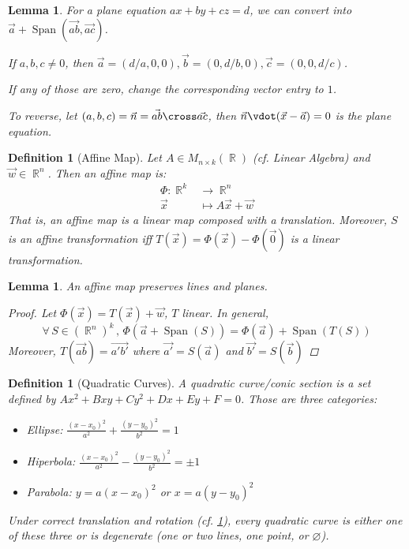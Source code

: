\documentclass[12pt]{article}
\let\emptyset\varnothing
\DeclareMathOperator{\Span}{Span}
\newcommand{\Forall}[1]{\forall\,{#1}\,,\,}
\DeclareMathOperator{\R}{\mathbb{R}}
\newtheorem{definition}[theorem]{Definition}
\newtheorem{lemma}[theorem]{Lemma}
\begin{document}
\begin{lemma}
  For a plane equation $ax+by+cz=d$, we can convert into $\vec{a}+\Span(\vec{ab},\vec{ac})$.
  \begin{compactitem}
    \item If $a,b,c\neq 0$, then $\vec{a}=(d/a,0,0),\vec{b}=(0,d/b,0),\vec{c}=(0,0,d/c)$.
    \item If any of those are zero, change the corresponding vector entry to $1$.
  \end{compactitem}
  To reverse, let $(a,b,c)=\vec{n}=\vec{ab}\cross\vec{ac}$, then $\vec{n}\vdot(\vec{x}-\vec{a})=0$ is the plane equation.
\end{lemma}

\begin{definition}[Affine Map]
  \label{def_affine}
  Let $A\in M_{n\times k}(\R)$ (cf. Linear Algebra) and $\vec{w}\in\R^n$. Then an affine map is: $$\begin{aligned}
    \Phi:\R^k&\to\R^n\\
    \vec{x}&\mapsto A\vec{x}+\vec{w}
  \end{aligned}$$ That is, an affine map is a linear map composed with a translation. Moreover, $S$ is an affine transformation iff $T(\vec{x})=\Phi(\vec{x})-\Phi(\vec{0})$ is a linear transformation.
\end{definition}

\begin{lemma}
  An affine map preserves lines and planes.
  \begin{proof}
    Let $\Phi(\vec{x})=T(\vec{x})+\vec{w}$, $T$ linear. In general, $$\Forall{S\in (\R^n)^k}\Phi(\vec{a}+\Span(S))=\Phi(\vec{a})+\Span(T(S))$$ Moreover, $T(\vec{ab})=\vec{a'b'}$ where $\vec{a'}=S(\vec{a})$ and $\vec{b'}=S(\vec{b})$
  \end{proof}
\end{lemma}

\begin{definition}[Quadratic Curves]
  A quadratic curve/conic section is a set defined by $Ax^2+Bxy+Cy^2+Dx+Ey+F=0$. Those are three categories:
  \begin{itemize}
    \item Ellipse: $\displaystyle \frac{(x-x_0)^2}{a^2}+\frac{(y-y_0)^2}{b^2}=1$
    \item Hiperbola: $\displaystyle \frac{(x-x_0)^2}{a^2}-\frac{(y-y_0)^2}{b^2}=\pm 1$
    \item Parabola: $y=a(x-x_0)^2$ or $x=a(y-y_0)^2$
  \end{itemize}
  Under correct translation and rotation (cf. \ref{def_affine}), every quadratic curve is either one of these three or is degenerate (one or two lines, one point, or $\emptyset$).
\end{definition}
\end{document}
